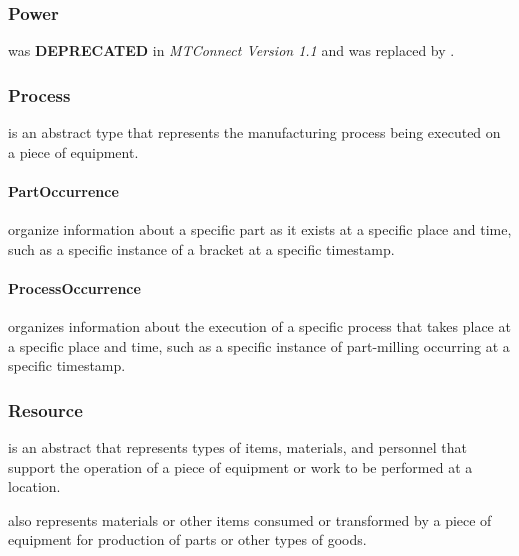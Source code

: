 \subsubsection{Power}
\label{sec:Power}



 was \textbf{DEPRECATED} in \textit{MTConnect Version 1.1} and was replaced by .


\subsubsection{Process}
\label{sec:Process}



 is an abstract  type that represents the manufacturing process being executed on a piece of equipment.



\paragraph{PartOccurrence}\mbox{}
\label{sec:PartOccurrence}


 \gls{organize} information about a specific part as it exists at a specific place and time, such as a specific instance of a bracket at a specific timestamp.


\paragraph{ProcessOccurrence}\mbox{}
\label{sec:ProcessOccurrence}


 \glspl{organize} information about the execution of a specific process that takes place at a specific place and time, such as a specific instance of part-milling occurring at a specific timestamp.


\subsubsection{Resource}
\label{sec:Resource}



 is an abstract  that represents types of items, materials, and personnel that support the operation of a piece of equipment or work to be performed at a location.

 also represents materials or other items consumed or transformed by a piece of equipment for production of parts or other types of goods.


